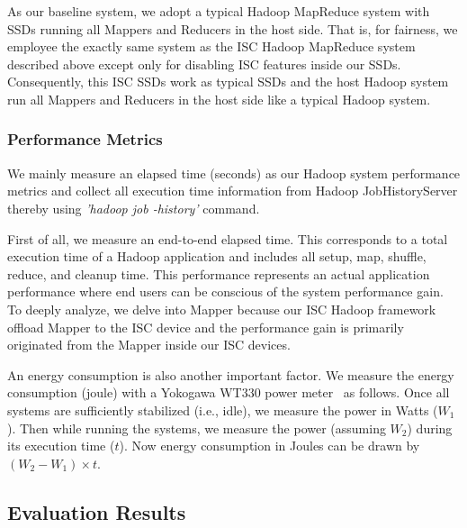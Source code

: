 As our baseline system, we adopt a typical Hadoop MapReduce system with SSDs running all Mappers and Reducers in the host side. That is, for fairness, we employee the exactly same system as the ISC Hadoop MapReduce system described above except only for disabling ISC features inside our SSDs. Consequently, this ISC SSDs work as typical SSDs and the host Hadoop system run all Mappers and Reducers in the host side like a typical Hadoop system.


\subsubsection{Performance Metrics}\label{subsubsec:performance_metrics}
We mainly measure an elapsed time (seconds) as our Hadoop system performance metrics and collect all execution time information from Hadoop JobHistoryServer thereby using \emph{'hadoop job -history'} command. 


First of all, we measure an end-to-end elapsed time. This corresponds to a total execution time of a Hadoop application and includes all setup, map, shuffle, reduce, and cleanup time. This performance represents an actual application performance where end users can be conscious of the system performance gain. To deeply analyze, we delve into Mapper because our ISC Hadoop framework offload Mapper to the ISC device and the performance gain is primarily originated from the Mapper inside our ISC devices. 

An energy consumption is also another important factor. We measure the energy consumption (joule) with a Yokogawa WT330 power meter~\cite{Powermeter:Yokogawa:techspec} as follows. Once all systems are sufficiently stabilized (i.e., idle), we measure the power in Watts ($W_1$). Then while running the systems, we measure the power (assuming $W_2$) during its execution time ($t$). Now energy consumption in Joules can be drawn by $(W_2-W_1)\times t$.



\subsection{Evaluation Results}\label{subsec:evaluation_results}


